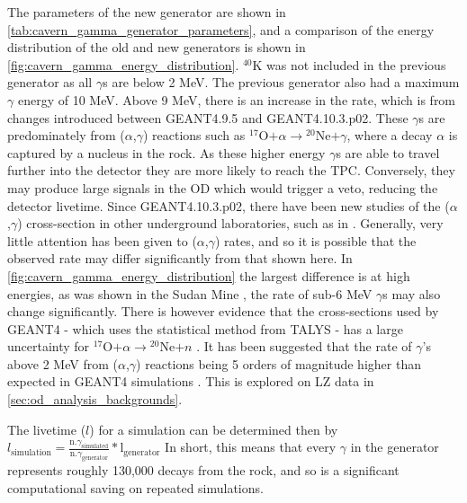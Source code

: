 \par
The parameters of the new generator are shown in \autoref{tab:cavern_gamma_generator_parameters}, and a comparison of the energy distribution of the old and new generators is shown in \autoref{fig:cavern_gamma_energy_distribution}.
$^{40}$K was not included in the previous generator as all $\gamma$s are below 2 MeV.
The previous generator also had a maximum $\gamma$ energy of 10 MeV.
Above 9 MeV, there is an increase in the rate, which is from changes introduced between GEANT4.9.5 and GEANT4.10.3.p02.
These $\gamma$s are predominately from ($\alpha$,$\gamma$) reactions such as ${}^{17}$O$ + \alpha \to {}^{20}$Ne$ + \gamma$, where a decay $\alpha$ is captured by a nucleus in the rock.
As these higher energy $\gamma$s are able to travel further into the detector they are more likely to reach the TPC.
Conversely, they may produce large signals in the OD which would trigger a veto, reducing the detector livetime.
Since GEANT4.10.3.p02, there have been new studies of the ($\alpha$,$\gamma$) cross-section in other underground laboratories, such as in \cite{cavern_gammas_in_Soudan_mine_ref}.
Generally, very little attention has been given to ($\alpha$,$\gamma$) rates, and so it is possible that the observed rate may differ significantly from that shown here. 
In \autoref{fig:cavern_gamma_energy_distribution} the largest difference is at high energies, as was shown in the Sudan Mine \cite{cavern_gammas_in_Soudan_mine_ref}, the rate of sub-6 MeV $\gamma$s may also change significantly. 
There is however evidence that the cross-sections used by GEANT4 - which uses the statistical method from TALYS \cite{talys_ref} - has a large uncertainty for ${}^{17}$O$ + \alpha \to {}^{20}$Ne$ + n$ \cite{alpha_gamma_statistical_error_ref}.
It has been suggested that the rate of $\gamma$'s above 2 MeV from ($\alpha$,$\gamma$) reactions being 5 orders of magnitude higher than expected in GEANT4 simulations \cite{soudanmine_counter_point_ref, alpha_gamma_reactions_ref}.
This is explored on LZ data in \autoref{sec:od_analysis_backgrounds}.

\par
The livetime ($l$) for a simulation can be determined then by $l_{\text{simulation}} = \frac{\text{n.} \gamma_{\text{simulated}}}{\text{n.} \gamma_{\text{generator}}} * \text{l}_{\text{generator}}$
In short, this means that every $\gamma$ in the generator represents roughly 130,000 decays from the rock, and so is a significant computational saving on repeated simulations.


